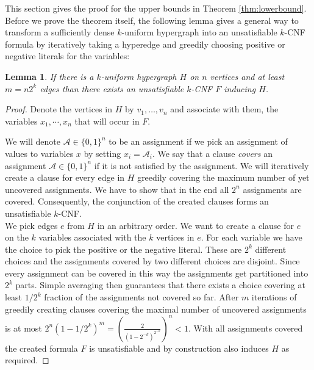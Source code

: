 \documentclass[11pt,letterpaper]{article}
\newtheorem{lemma}[theorem]{Lemma}
\def\A{\mathcal{A}}
\begin{document}
This section gives the proof for the upper bounds in Theorem \ref{thm:lowerbound}.\\

Before we prove the theorem itself, the following lemma gives a general way to transform a sufficiently dense $k$-uniform hypergraph into an unsatisfiable $k$-CNF formula by iteratively taking a hyperedge and greedily choosing positive or negative literals for the variables:\\

\begin{lemma}\label{lemma:construction-unsat}
If there is a $k$-uniform hypergraph $H$ on $n$ vertices and at least $m = n 2^k$ edges than there exists an unsatisfiable $k$-CNF $F$ inducing $H$. 
\end{lemma}
\begin{proof}
Denote the vertices in $H$ by $v_1,\ldots,v_n$ and associate with them, the variables $x_1,\cdots,x_n$ that will occur in $F$.

We will denote $\A\in\{0,1\}^n$ to be an assignment if we pick an assignment of values to variables $x$ by setting $x_i=\A_i$.
We say that a clause \emph{covers} an assignment $\A\in\{0,1\}^n$ if it is not satisfied by the assignment. We will iteratively create a clause for every edge in $H$ greedily covering the maximum number of yet uncovered assignments. We have to show that in the end all $2^n$ assignments are covered. Consequently, the conjunction of the created clauses forms an unsatisfiable $k$-CNF.\\

We pick edges $e$ from $H$ in an arbitrary order. We want to create a clause for $e$ on the $k$ variables associated with the $k$ vertices in $e$. For each variable we have the choice to pick the positive or the negative literal. These are $2^k$ different choices and the assignments covered by two different choices are disjoint. Since every assignment can be covered in this way the assignments get partitioned into $2^k$ parts. Simple averaging then guarantees that there exists a choice covering at least $1/2^k$ fraction of the assignments not covered so far. After $m$ iterations of greedily creating clauses covering the maximal number of uncovered assignments is at most $2^n \left(1 - 1/2^k\right)^m = \left(\frac{2}{(1 - 2^{-k})^{2^{-k}}}\right)^n < 1$. With all assignments covered the created formula $F$ is unsatisfiable and by construction also induces $H$ as required.
\end{proof}
\end{document}
